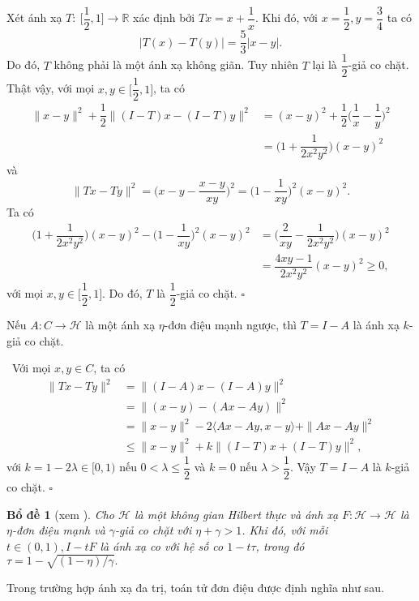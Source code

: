 \documentclass[14pt, oneside,A4paper]{book}
\theoremstyle{plain}
\newcommand{\eproof}{\hfill $\square$}
\newcommand{\chm}{{\bf  Chứng minh.}}
\newtheorem{bd}[theorem]{Bổ đề}
\begin{document}
\vd\rm Xét ánh xạ $T:\ \Big [\dfrac{1}{2},1 \Big ]\longrightarrow \mathbb R$ xác định bởi $Tx=x+\dfrac{1}{x}$. Khi đó, với $x=\dfrac{1}{2}, y=\dfrac{3}{4}$ ta có
$$|T(x)-T(y)|=\dfrac{5}{3}|x-y|.$$
Do đó, $T$ không phải là một ánh xạ không giãn. Tuy nhiên $T$ lại là $\dfrac{1}{2}$-giả co chặt. Thật vậy, với mọi $x,y\in \Big [\dfrac{1}{2},1\Big ]$, ta có
\begin{align*}
\|x-y\|^2+\dfrac{1}{2}\Big \|(I-T)x-(I-T)y \Big \|^2&=(x-y)^2 +\dfrac{1}{2}\Big (\dfrac{1}{x}-\dfrac{1}{y} \Big )^2\\
&=\Big (1+\dfrac{1}{2x^2y^2} \Big )(x-y)^2
\end{align*}
và
$$\|Tx-Ty\|^2=\Big (x-y -\dfrac{x-y}{xy} \Big )^2=\Big (1-\dfrac{1}{xy} \Big )^2(x-y)^2.$$
Ta có
\begin{align*}
\Big (1+\dfrac{1}{2x^2y^2}\Big )(x-y)^2-\Big (1-\dfrac{1}{xy}\Big )^2(x-y)^2&=\Big (\dfrac{2}{xy}-\dfrac{1}{2x^2y^2} \Big )(x-y)^2\\
&=\dfrac{4xy-1}{2x^2y^2}(x-y)^2 \geq 0,
\end{align*}
với mọi $x,y\in \Big [\dfrac{1}{2},1 \Big ]$. Do đó, $T$ là $\dfrac{1}{2}$-giả co chặt.
\eproof

\label{NDM} Nếu $A: C\longrightarrow \mathcal H$ là một ánh xạ $\eta$-đơn điệu mạnh ngược, thì $T=I-A$ là ánh xạ $k$-giả co chặt.

\noindent \chm \rm \  Với mọi $x,y\in C$, ta có
\begin{equation*}
\begin{split}
\|Tx-Ty\|^2&=\|(I-A)x-(I-A)y\|^2\\
&=\|(x-y)-(Ax-Ay)\|^2\\
&=\|x-y\|^2-2\langle Ax-Ay,x-y\rangle +\|Ax-Ay\|^2\\
&\le \|x-y\|^2+k\|(I-T)x+(I-T)y\|^2,
\end{split}
\end{equation*}
với $k=1-2\lambda\in [0,1)$ nếu $0<\lambda\le\dfrac{1}{2}$ và $k=0$ nếu $\lambda >\dfrac{1}{2}$. Vậy $T=I-A$ là $k$-giả co chặt.
\eproof

\begin{bd}[xem \cite{AS}]\label{bd2.2.2}
	Cho $\mathcal H$ là một không gian Hilbert thực và ánh xạ  $F:\mathcal H\rightarrow \mathcal H$ là $\eta$-đơn điệu mạnh và $\gamma$-giả co chặt  với $\eta +\gamma >1$. Khi đó, với mỗi $t \in (0,1),I-tF$ là ánh xạ co với hệ số co $1-t\tau$, trong đó $\tau =1-\sqrt{(1-\eta)/\gamma}.$
\end{bd}	

Trong trường hợp ánh xạ đa trị, toán tử đơn điệu được định nghĩa như sau.
\end{document}

